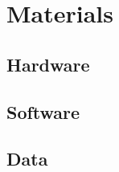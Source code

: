 \chapter{Materials}
\label{chap:materials}
\section*{Hardware}
\section*{Software}
\section*{Data}
\cleardoublepage
